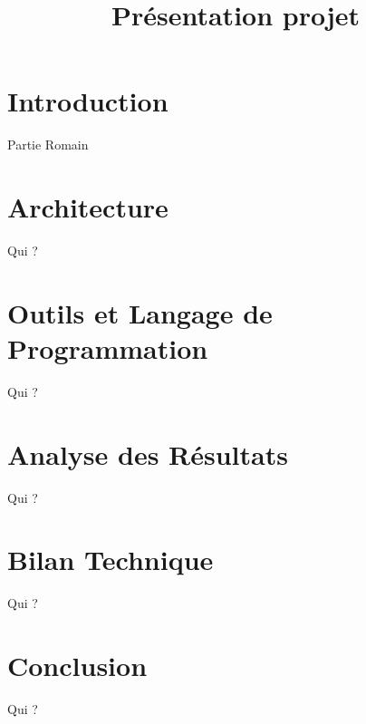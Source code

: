 
\usepackage{../tex/myInfolines}
\usepackage{longtable,array}
\title{Présentation projet}


	\begin{frame}
		\titlepage
	\end{frame}
	
	\section*{Introduction}
		\begin{frame}
		Partie Romain
		\end{frame}
	
	\begin{frame}
		\tableofcontents
	\end{frame}
	
	\section{Architecture}
		\begin{frame}
	Qui ?
		\end{frame}
		
	\section{{\small Outils et Langage de Programmation}}
		\begin{frame}
	Qui ?
		\end{frame}
		
	\section{Analyse des Résultats}
		\begin{frame}
	Qui ?
		\end{frame}
		
	\section{Bilan Technique}
		\begin{frame}
	Qui ?
		\end{frame}

	\section{Conclusion}
		\begin{frame}
	Qui ?
		\end{frame}	
		

